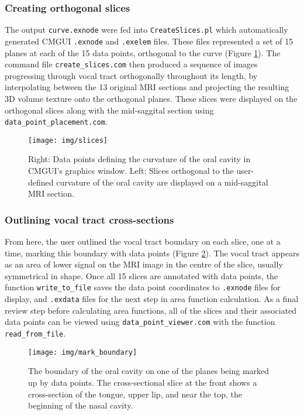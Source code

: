 \subsubsection{Creating orthogonal slices}

The output \verb|curve.exnode| were fed into \verb|CreateSlices.pl| which automatically generated CMGUI \verb|.exnode| and \verb|.exelem| files. These files represented a set of 15 planes at each of the 15 data points, orthogonal to the curve (Figure \ref{fig:slices}). The command file \verb|create_slices.com| then produced a sequence of images progressing through vocal tract orthogonally throughout its length, by interpolating between the 13 original MRI sections and projecting the resulting 3D volume texture onto the orthogonal planes. These slices were displayed on the orthogonal slices along with the mid-saggital section using \verb|data_point_placement.com|.

\begin{figure}[ht]
  \centering
  \texttt{[image: img/slices]}
  \caption{Right: Data points defining the curvature of the oral cavity in CMGUI's graphics window. Left: Slices orthogonal to the user-defined curvature of the oral cavity are displayed on a mid-saggital MRI section.}
  \label{fig:slices}
\end{figure}

\subsubsection{Outlining vocal tract cross-sections}

 From here, the user outlined the vocal tract boundary on each slice, one at a time, marking this boundary with data points (Figure \ref{fig:mark_boundary}). The vocal tract appears as an area of lower signal on the MRI image in the centre of the slice, usually symmetrical in shape. Once all 15 slices are annotated with data points, the function \verb|write_to_file| saves the data point coordinates to \verb|.exnode| files for display, and \verb|.exdata| files for the next step in area function calculation. As a final review step before calculating area functions, all of the slices and their associated data points can be viewed using \verb|data_point_viewer.com| with the function \verb|read_from_file|.

\begin{figure}[ht]
  \centering
  \texttt{[image: img/mark\_boundary]}
  \caption{The boundary of the oral cavity on one of the planes being marked up by data points. The cross-sectional slice at the front shows a cross-section of the tongue, upper lip, and near the top, the beginning of the nasal cavity.}
  \label{fig:mark_boundary}
\end{figure}


